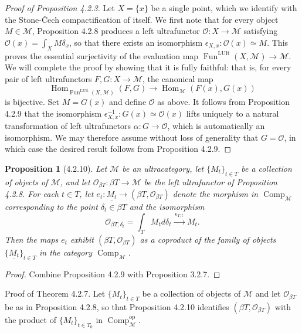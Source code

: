 \documentclass[11pt]{article}
\theoremstyle{plain}
\newtheorem{proposition}{Proposition}
\theoremstyle{definition}
\newcommand{\Comp}{\operatorname{Comp}}
\newcommand{\FunLUlt}{\operatorname{Fun}^{\mathrm{LUlt}}}
\newcommand{\Hom}{\operatorname{Hom}}
\begin{document}

\begin{proof}[Proof of Proposition 4.2.3]
Let $X = \{x\}$ be a single point, which we identify with the Stone-\v{C}ech compactification of itself. We first note that for every object $M \in \mathcal{M}$, Proposition 4.2.8 produces a left ultrafunctor $\mathcal{O} : X \to \mathcal{M}$ satisfying $\mathcal{O}(x) = \int_X M\delta_x$, so that there exists an isomorphism $\epsilon_{X,x} : \mathcal{O}(x) \simeq M$. This proves the essential surjectivity of the evaluation map $\FunLUlt(X, \mathcal{M}) \to \mathcal{M}$. We will complete the proof by showing that it is fully faithful: that is, for every pair of left ultrafunctors $F, G : X \to \mathcal{M}$, the canonical map
\[
\Hom_{\FunLUlt(X, \mathcal{M})}(F, G) \to \Hom_{\mathcal{M}}(F(x), G(x))
\]
is bijective. Set $M = G(x)$ and define $\mathcal{O}$ as above. It follows from Proposition 4.2.9 that the isomorphism $\epsilon^{-1}_{X,x} : G(x) \simeq \mathcal{O}(x)$ lifts uniquely to a natural transformation of left ultrafunctors $\alpha : G \to \mathcal{O}$, which is automatically an isomorphism. We may therefore assume without loss of generality that $G = \mathcal{O}$, in which case the desired result follows from Proposition 4.2.9.
\end{proof}


\begin{proposition}[4.2.10]
Let $\mathcal{M}$ be an ultracategory, let $\{M_t\}_{t \in T}$ be a collection of objects of $\mathcal{M}$, and let $\mathcal{O}_{\beta T} : \beta T \to \mathcal{M}$ be the left ultrafunctor of Proposition 4.2.8. For each $t \in T$, let $e_t : \underline{M_t} \to (\beta T, \mathcal{O}_{\beta T})$ denote the morphism in $\Comp_{\mathcal{M}}$ corresponding to the point $\delta_t \in \beta T$ and the isomorphism
\[
\mathcal{O}_{\beta T, \delta_t} = \int_T M_t d\delta_t \xrightarrow{\ \epsilon_{T,t}\ } M_t.
\]
Then the maps $e_t$ exhibit $(\beta T, \mathcal{O}_{\beta T})$ as a coproduct of the family of objects $\{\underline{M_t}\}_{t \in T}$ in the category $\Comp_{\mathcal{M}}$.
\end{proposition}

\begin{proof}
Combine Proposition 4.2.9 with Proposition 3.2.7.
\end{proof}

Proof of Theorem 4.2.7. Let $\{M_t\}_{t \in T}$ be a collection of objects of $\mathcal{M}$ and let $\mathcal{O}_{\beta T}$ be as in Proposition 4.2.8, so that Proposition 4.2.10 identifies $(\beta T, \mathcal{O}_{\beta T})$ with the product of $\{M_t\}_{t \in T_0}$ in $\Comp^{\mathrm{op}}_{\mathcal{M}}$.
\end{document}
